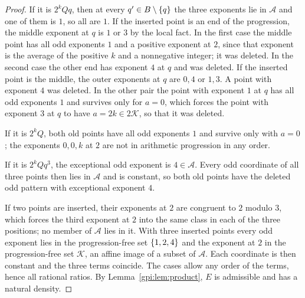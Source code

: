 \begin{proof}
If it is $2^kQq$, then at every $q'\in B\setminus\{q\}$ the three exponents lie in
$\mathcal A$ and one of them is $1$, so all are $1$. If the inserted point is an end of the
progression, the middle exponent at $q$ is $1$ or $3$ by the local fact. In the first case
the middle point has all odd exponents $1$ and a positive exponent at $2$, since that
exponent is the average of the positive $k$ and a nonnegative integer; it was deleted. In
the second case the other end has exponent $4$ at $q$ and was deleted. If the inserted point
is the middle, the outer exponents at $q$ are $0,4$ or $1,3$. A point with exponent $4$ was
deleted. In the other pair the point with exponent $1$ at $q$ has all odd exponents $1$ and
survives only for $a=0$, which forces the point with exponent $3$ at $q$ to have
$a=2k\in2\mathcal K$, so that it was deleted.

If it is $2^kQ$, both old points have all odd exponents $1$ and survive only with $a=0$;
the exponents $0,0,k$ at $2$ are not in arithmetic progression in any order.

If it is $2^kQq^3$, the exceptional odd exponent is $4\in\mathcal A$. Every odd coordinate
of all three points then lies in $\mathcal A$ and is constant, so both old points have the
deleted odd pattern with exceptional exponent $4$.

If two points are inserted, their exponents at $2$ are congruent to $2$ modulo $3$, which
forces the third exponent at $2$ into the same class in each of the three positions; no
member of $\mathcal A$ lies in it. With three inserted points every odd exponent lies in the
progression-free set $\{1,2,4\}$ and the exponent at $2$ in the progression-free set
$\mathcal K$, an affine image of a subset of $\mathcal A$. Each coordinate is then constant
and the three terms coincide. The cases allow any order of the terms, hence all rational
ratios. By Lemma~\ref{gpi:lem:product}, $E$ is admissible and has a natural density.


\end{proof}
